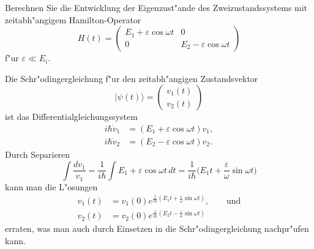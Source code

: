 Berechnen Sie die Entwicklung der Eigenzust"ande des Zweizustandssystems
mit zeitabh"angigem Hamilton-Operator
\[
H(t)
=
\begin{pmatrix}
E_1+\varepsilon\cos\omega t & 0                          \\
0                           & E_2-\varepsilon\cos\omega t
\end{pmatrix}
\]
f"ur $\varepsilon\ll E_i$.

\begin{loesung}
Die Schr"odingergleichung f"ur den zeitabh"angigen Zustandsvektor
\[
|\psi(t)\rangle
=
\begin{pmatrix}
v_1(t) \\
v_2(t)
\end{pmatrix}
\]
ist das Differentialgleichungssystem
\begin{align*}
i\hbar\dot v_1&=(E_1+\varepsilon\cos\omega t)v_1,\\
i\hbar\dot v_2&=(E_2-\varepsilon\cos\omega t)v_2.
\end{align*}
Durch Separieren
\[
\int\frac{dv_1}{v_1}
=
\frac{1}{i\hbar}\int E_1 + \varepsilon\cos\omega t\,dt
=
\frac1{i\hbar}\biggl(E_1t+\frac{\varepsilon}{\omega}\sin\omega t\biggr)
\]
kann man die L"osungen
\begin{align*}
v_1(t)
&=
v_1(0)e^{\frac1{i\hbar}(E_1t+\frac{\varepsilon}{\omega}\sin\omega t)}
,\qquad\text{und}
\\
v_2(t)
&=
v_2(0)e^{\frac1{i\hbar}(E_2t-\frac{\varepsilon}{\omega}\sin\omega t)}
\end{align*}
erraten, was man auch durch Einsetzen in die Schr"odingergleichung
nachpr"ufen kann.
\end{loesung}

